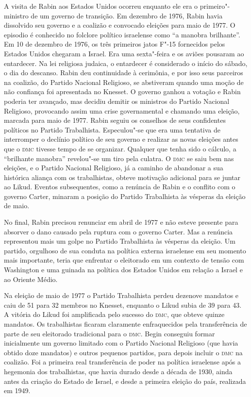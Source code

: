 A visita de Rabin aos Estados Unidos ocorreu enquanto ele era o primeiro"-ministro
de um governo de transição. Em dezembro de 1976, Rabin havia
dissolvido seu governo e a coalizão e convocado eleições para maio de
1977. O episodio é conhecido no folclore político israelense como ``a
manobra brilhante''. Em 10 de dezembro de 1976, os três primeiros jatos
F"-15 fornecidos pelos Estados Unidos chegaram a Israel. Era uma sexta"-feira e os
aviões pousaram ao entardecer. Na lei religiosa judaica, o entardecer é
considerado o início do sábado, o dia do descanso. Rabin deu
continuidade à cerimônia, e por isso seus parceiros na coalizão, do
Partido Nacional Religioso, se abstiveram quando uma moção de
não confiança foi apresentada no Knesset. O governo ganhou a votação e
Rabin poderia ter avançado, mas decidiu demitir os ministros do Partido
Nacional Religioso, provocando assim uma crise governamental e chamando
uma eleição, marcada para maio de 1977. Rabin seguiu os conselhos de
seus confidentes políticos no Partido Trabalhista. Especulou"-se que era
uma tentativa de interromper o declínio político de seu governo e
realizar as novas eleições antes que o \textsc{dmc} tivesse tempo de se
organizar. Qualquer que tenha sido o cálculo, a ``brilhante manobra''
revelou"-se um tiro pela culatra. O \textsc{dmc} se saiu bem nas eleições,
e o Partido Nacional Religioso,
já a caminho de abandonar a sua histórica aliança com os trabalhistas,
obteve motivação adicional para se juntar ao Likud. Eventos
subsequentes, como a renúncia de Rabin e o conflito com o governo
Carter, minaram a posição do Partido Trabalhista às vésperas da eleição
de maio.

No final, Rabin precisou renunciar em abril de 1977 e não esteve
presente para absorver o dano causado pela ruptura com o governo Carter.
Mas a renúncia representou mais um golpe no Partido Trabalhista às
vésperas da eleição. Um partido, orgulhoso de sua conduta na política
externa israelense em seu momento mais importante, teria que enfrentar o
eleitorado em um contexto de tensão com Washington e uma guinada na
política dos Estados Unidos em relação a Israel e ao Oriente Médio.

Na eleição de maio de 1977 o Partido Trabalhista perdeu dezenove
mandatos e caiu de 51 para 32 membros no Knesset,
enquanto o Likud subia de 39 para 43. A vitória
do Likud foi amplificada pelo sucesso do \textsc{dmc}, que obteve quinze
mandatos. Os trabalhistas ficaram claramente enfraquecidos pela
transferência de parte de seu eleitorado tradicional para o \textsc{dmc}. Begin
conseguiu formar inicialmente um governo limitado com o Partido Nacional Religioso (que havia
obtido doze mandatos) e outros pequenos partidos, para depois incluir o
\textsc{dmc} na coalizão. Foi a primeira real transferência de poder na política
israelense após a hegemonia dos trabalhistas, que havia durado desde a
década de 1930, ainda antes da criação do Estado de Israel, e desde a
primeira eleição do país, realizada em 1949.

